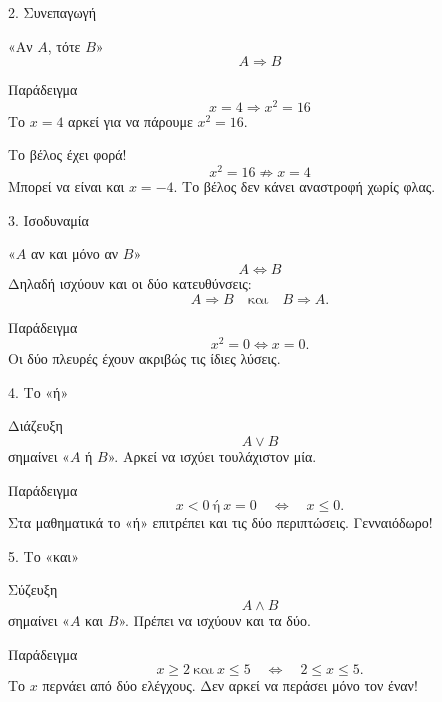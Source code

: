 \documentclass{presentation}
\begin{document}
\begin{frame}{2. Συνεπαγωγή}
  \begin{block}{«Αν $A$, τότε $B$»}
    \[
      A\Rightarrow B
    \]
  \end{block}

  \begin{exampleblock}{Παράδειγμα}
    \[
      x=4\Rightarrow x^2=16
    \]
    Το $x=4$ αρκεί για να πάρουμε $x^2=16$.
  \end{exampleblock}

  \begin{alertblock}{Το βέλος έχει φορά!}
    \[
      x^2=16\not\Rightarrow x=4
    \]
    Μπορεί να είναι και $x=-4$. Το βέλος δεν κάνει αναστροφή χωρίς φλας.
  \end{alertblock}
\end{frame}

\begin{frame}{3. Ισοδυναμία}
  \begin{block}{«$A$ αν και μόνο αν $B$»}
    \[
      A\Leftrightarrow B
    \]
    Δηλαδή ισχύουν και οι δύο κατευθύνσεις:
    \[
      A\Rightarrow B \quad\text{και}\quad B\Rightarrow A.
    \]
  \end{block}

  \begin{exampleblock}{Παράδειγμα}
    \[
      x^2=0\Leftrightarrow x=0.
    \]
    Οι δύο πλευρές έχουν ακριβώς τις ίδιες λύσεις.
  \end{exampleblock}
\end{frame}

\begin{frame}{4. Το «ή»}
  \begin{block}{Διάζευξη}
    \[
      A\vee B
    \]
    σημαίνει «$A$ ή $B$». Αρκεί να ισχύει τουλάχιστον μία.
  \end{block}

  \begin{exampleblock}{Παράδειγμα}
    \[
      x<0\ \text{ή}\ x=0
      \quad\Longleftrightarrow\quad x\le0.
    \]
    Στα μαθηματικά το «ή» επιτρέπει και τις δύο περιπτώσεις. Γενναιόδωρο!
  \end{exampleblock}
\end{frame}

\begin{frame}{5. Το «και»}
  \begin{block}{Σύζευξη}
    \[
      A\wedge B
    \]
    σημαίνει «$A$ και $B$». Πρέπει να ισχύουν και τα δύο.
  \end{block}

  \begin{exampleblock}{Παράδειγμα}
    \[
      x\ge2\ \text{και}\ x\le5
      \quad\Longleftrightarrow\quad 2\le x\le5.
    \]
    Το $x$ περνάει από δύο ελέγχους. Δεν αρκεί να περάσει μόνο τον έναν!
  \end{exampleblock}
\end{frame}
\end{document}
